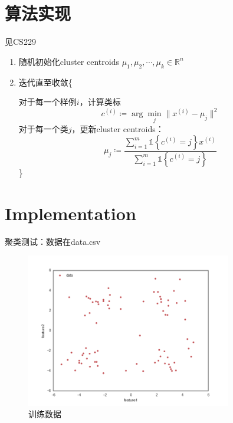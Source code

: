 \documentclass{ctexart}
\begin{document}
\section{算法实现}
见CS229\cite{stanf:cs229}
%
\begin{enumerate}[1.]
\item 随机初始化cluster centroids $\mu_1,\mu_2,\cdots,\mu_k\in\mathbb{R}^n$
\item 迭代直至收敛\{

对于每一个样例$i$，计算类标
\begin{equation}
c^{\left(i\right)}\coloneqq \arg\min\limits_{j}\big\| x^{\left(i\right)}-\mu_{j}\big\|^2
\end{equation}
对于每一个类$j$，更新cluster centroids：
\begin{equation}
\mu_j \coloneqq \frac{\sum\limits_{i=1}^{m}\mathds{1}\left\{c^{\left(i\right)}=j\right\}x^{\left(i\right)}}{\sum\limits_{i=1}^{m}\mathds{1}\left\{c^{\left(i\right)}=j\right\}}
\end{equation}
\}
\end{enumerate}

%
\section{Implementation}
聚类测试：数据在data.csv
\begin{figure}[H]
\begin{center}
\includegraphics[width=0.8\textwidth]{fig/raw.png} %
\caption{训练数据}
\end{center}
\end{figure}
\end{document}
